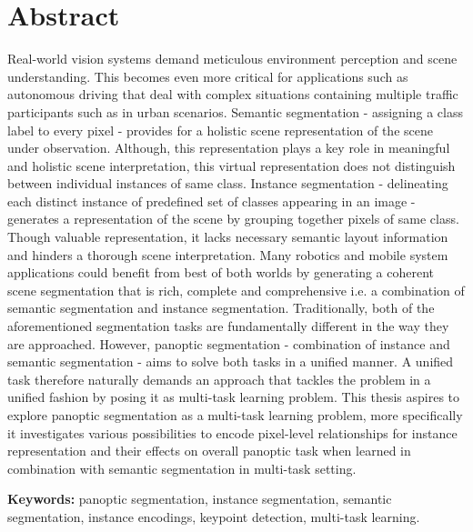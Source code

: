 
\chapter*{Abstract}

Real-world vision systems demand meticulous environment perception and scene understanding. This becomes even more critical for applications such as autonomous driving that deal with complex situations containing multiple traffic participants such as in urban scenarios. 
Semantic segmentation - assigning a class label to every pixel - provides for a holistic scene representation of the scene under observation. Although, this representation plays a key role in meaningful and holistic scene interpretation, this virtual representation does not distinguish between individual instances of same class. Instance segmentation - delineating each distinct instance of predefined set of classes appearing in an image - generates a representation of the scene by grouping together pixels of same class. Though valuable representation, it lacks necessary semantic layout information and hinders a thorough scene interpretation.
Many robotics and mobile system applications could benefit from best of both worlds by generating a coherent scene segmentation that is rich, complete and comprehensive i.e. a combination of semantic segmentation and instance segmentation. Traditionally, both of the aforementioned segmentation tasks are fundamentally different in the way they are approached. However, panoptic segmentation - combination of instance and semantic segmentation - aims to solve both tasks in a unified manner. A unified task therefore naturally demands an approach that tackles the problem in a unified fashion by posing it as multi-task learning problem. This thesis aspires to explore panoptic segmentation as a multi-task learning problem, 
more specifically it investigates various possibilities  to encode pixel-level relationships for instance representation and their effects on overall panoptic task when learned in combination with semantic segmentation in multi-task setting. 



\textbf{Keywords:} panoptic segmentation, instance segmentation, semantic segmentation, instance encodings, keypoint detection, multi-task learning.


